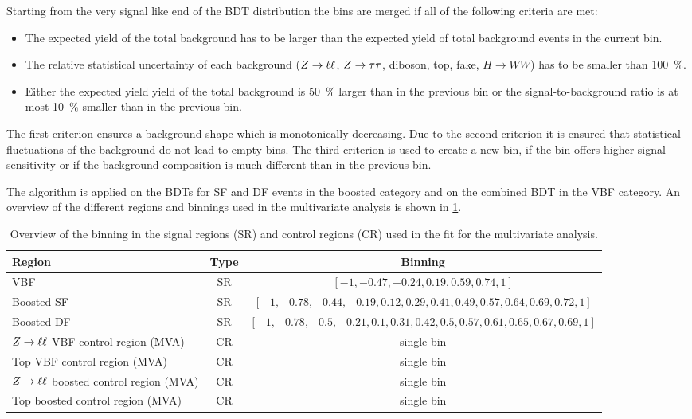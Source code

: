 Starting from the very signal like end of the BDT distribution the bins are merged if all of the following criteria are met:
\begin{itemize}
    \item The expected yield of the total background has to be larger than the expected yield of total background events in the current bin.
    \item The relative statistical uncertainty of each background ($Z \to \ell \ell$, $Z \to \tau \tau$, diboson, top, fake, $H \to WW$) has to be smaller than \SI{100}{\percent}.
    \item Either the expected yield yield of the total background is \SI{50}{\percent} larger than in the previous bin or
        the signal-to-background ratio is at most \SI{10}{\percent} smaller than in the previous bin.
\end{itemize}

The first criterion ensures a background shape which is monotonically decreasing.
Due to the second criterion it is ensured that statistical fluctuations of the background do not lead to empty bins.
The third criterion is used to create a new bin, if the bin offers higher signal sensitivity or if the background composition
is much different than in the previous bin.

The algorithm is applied on the BDTs for SF and DF events in the boosted category and on the combined BDT in the VBF category.
An overview of the different regions and binnings used in the multivariate analysis is shown in \cref{tab:fit:regions:mva}.

\begin{table}
    \centering
    \caption{Overview of the binning in the signal regions (SR) and control regions (CR) used in the fit for the multivariate analysis.}\label{tab:fit:regions:mva}
    \begin{tabular}{lcc}
        \toprule
        Region                              & Type  & Binning \\ \midrule
        VBF                                 & SR    & $\left[-1, -0.47, -0.24,  0.19, 0.59, 0.74, 1\right]$ \\
        Boosted SF                          & SR    & $\left[-1, -0.78, -0.44, -0.19, 0.12, 0.29, 0.41, 0.49, 0.57, 0.64, 0.69, 0.72, 1\right]$ \\
        Boosted DF                          & SR    & $\left[-1, -0.78, -0.5,  -0.21, 0.1,  0.31, 0.42, 0.5,  0.57, 0.61, 0.65, 0.67, 0.69, 1\right]$ \\
        $Z \to \ell \ell$ VBF control region (MVA)     & CR    & single bin\\
        Top VBF control region (MVA)        & CR    & single bin\\
        $Z \to \ell \ell$ boosted control region (MVA) & CR    & single bin\\
        Top boosted control region (MVA)    & CR    & single bin\\
    \end{tabular}
\end{table}


